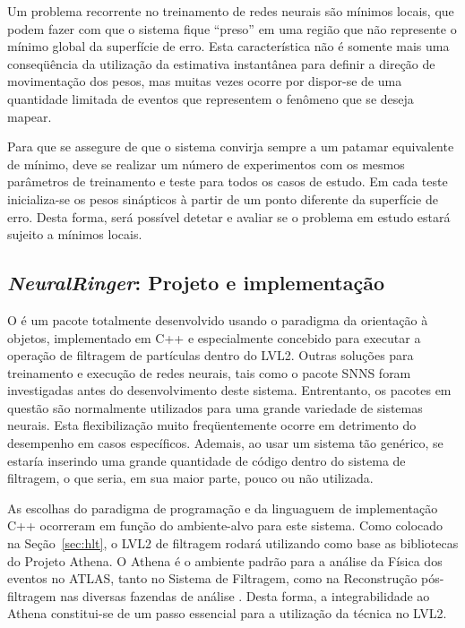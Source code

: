 Um problema recorrente no treinamento de redes neurais são mínimos locais, que
podem fazer com que o sistema fique ``preso'' em uma região que não represente
o mínimo global da superfície de erro. Esta característica não é somente mais
uma conseqüência da utilização da estimativa instantânea para definir a
direção de movimentação dos pesos, mas muitas vezes ocorre por dispor-se de
uma quantidade limitada de eventos que representem o fenômeno que se deseja
mapear.

Para que se assegure de que o sistema convirja sempre a um patamar equivalente
de mínimo, deve se realizar um número de experimentos com os mesmos parâmetros
de treinamento e teste para todos os casos de estudo. Em cada teste
inicializa-se os pesos sinápticos à partir de um ponto diferente da superfície
de erro. Desta forma, será possível detetar e avaliar se o problema em estudo
estará sujeito a mínimos locais.

\subsection{\textit{NeuralRinger}: Projeto e implementação}
\label{sec:framework}

O  é um pacote totalmente desenvolvido usando o paradigma da
orientação à objetos, implementado em C++ \cite{stroustrup} e especialmente
concebido para executar a operação de filtragem de partículas dentro do
LVL2. Outras soluções para treinamento e execução de redes neurais, tais como
o pacote SNNS \cite{snns} foram investigadas antes do desenvolvimento deste
sistema. Entrentanto, os pacotes em questão são normalmente utilizados para
uma grande variedade de sistemas neurais. Esta flexibilização muito
freqüentemente ocorre em detrimento do desempenho em casos
específicos. Ademais, ao usar um sistema tão genérico, se estaría inserindo
uma grande quantidade de código dentro do sistema de filtragem, o que seria,
em sua maior parte, pouco ou não utilizada.

As escolhas do paradigma de programação e da linguaguem de implementação C++
ocorreram em função do ambiente-alvo para este sistema. Como colocado na
Seção~\ref{sec:hlt}, o LVL2 de filtragem rodará utilizando como base as
bibliotecas do Projeto Athena. O Athena é o ambiente padrão para a análise da
Física dos eventos no ATLAS, tanto no Sistema de Filtragem, como na
Reconstrução pós-filtragem nas diversas fazendas de análise
. Desta forma, a integrabilidade ao Athena
constitui-se de um passo essencial para a utilização da técnica no LVL2.


